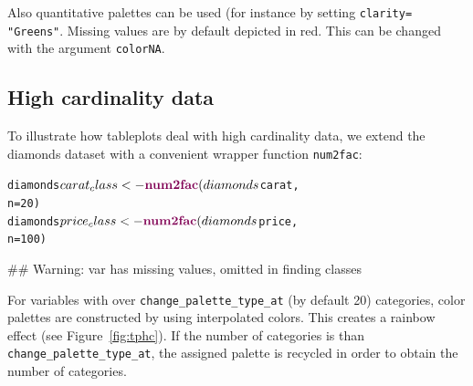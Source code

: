 \documentclass[11pt, fleqn, a4paper]{article}\usepackage{graphicx, color}
\makeatletter
\newcommand{\hlfunctioncall}[1]{\textcolor[rgb]{0.501960784313725,0,0.329411764705882}{\textbf{#1}}}%
\newenvironment{kframe}{%
 \def\at@end@of@kframe{}%
 \ifinner\ifhmode%
  \def\at@end@of@kframe{\end{minipage}}%
  \begin{minipage}{\columnwidth}%
 \fi\fi%
 \def\FrameCommand##1{\hskip\@totalleftmargin \hskip-\fboxsep
 \colorbox{shadecolor}{##1}\hskip-\fboxsep
     \hskip-\linewidth \hskip-\@totalleftmargin \hskip\columnwidth}%
 \MakeFramed {\advance\hsize-\width
   \@totalleftmargin\z@ \linewidth\hsize
   \@setminipage}}%
 {\par\unskip\endMakeFramed%
 \at@end@of@kframe}
\newenvironment{knitrout}{}{} %
\makeatother
\begin{document}
Also quantitative palettes can be used (for instance by setting {\tt clarity=} {\tt "Greens"}. Missing values are by default depicted in red. This can be changed with the argument {\tt colorNA}.

\subsection{High cardinality data}
To illustrate how tableplots deal with high cardinality data, we extend the diamonds dataset with a convenient wrapper function {\tt num2fac}:

\begin{knitrout}
\color{fgcolor}\begin{kframe}
\begin{alltt}
diamonds$carat_class <- \hlfunctioncall{num2fac}(diamonds$carat, 
    n = 20)
diamonds$price_class <- \hlfunctioncall{num2fac}(diamonds$price, 
    n = 100)
\end{alltt}


{\ttfamily\noindent\textcolor{warningcolor}{\#\# Warning: var has missing values, omitted in finding classes}}\end{kframe}
\end{knitrout}


For variables with over {\tt change\_palette\_type\_at} (by default 20) categories, color palettes are constructed by using interpolated colors. This creates a rainbow effect (see Figure~\ref{fig:tphc}). If the number of categories is than {\tt change\_palette\_type\_at}, the assigned palette is recycled in order to obtain the number of categories.
\end{document}

